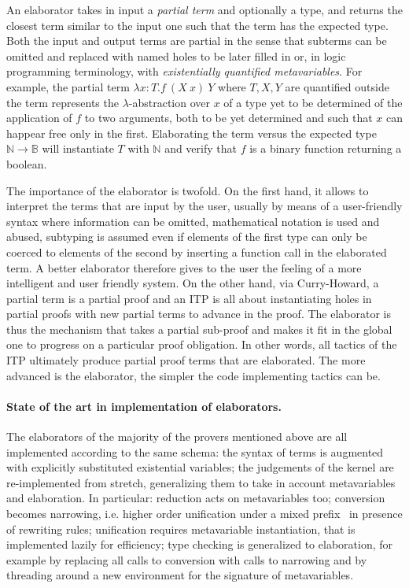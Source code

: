 \documentclass{easychair}
\begin{document}
An elaborator takes in input a \emph{partial term} and optionally a
type, and returns the closest term similar to the input one such that
the term has the expected type. Both the input and output terms are
partial in the sense that subterms can be omitted and replaced with
named holes to be later filled in or, in logic programming
terminology, with \emph{existentially quantified metavariables}. For
example, the partial term $\lambda x: T. f~(X~x)~Y$ where $T,X,Y$ are
quantified outside the term represents the $\lambda$-abstraction over
$x$ of a type yet to be determined of the application of $f$ to two
arguments, both to be yet determined and such that $x$ can happear
free only in the first. Elaborating the term versus the expected type
$\mathbb{N} \to \mathbb{B}$ will instantiate $T$ with $\mathbb{N}$ and
verify that $f$ is a binary function returning a boolean.

The importance of the elaborator is twofold. On the first hand, it
allows to interpret the terms that are input by the user, usually by
means of a user-friendly syntax where information can be omitted,
mathematical notation is used and abused, subtyping is assumed even if
elements of the first type can only be coerced to elements of the
second by inserting a function call in the elaborated term. A better
elaborator therefore gives to the user the feeling of a more
intelligent and user friendly system. On the other hand, via
Curry-Howard, a partial term is a partial proof and an ITP is all
about instantiating holes in partial proofs with new partial terms to
advance in the proof. The elaborator is thus the mechanism that takes
a partial sub-proof and makes it fit in the global one to progress on
a particular proof obligation. In other words, all tactics of the ITP
ultimately produce partial proof terms that are elaborated. The more
advanced is the elaborator, the simpler the code implementing tactics
can be.

\paragraph{State of the art in implementation of elaborators.}

The elaborators of the majority of the provers mentioned above are all
implemented according to the same schema: the syntax of terms is
augmented with explicitly substituted existential variables; the
judgements of the kernel are re-implemented from stretch, generalizing
them to take in account metavariables and elaboration. In particular:
reduction acts on metavariables too; conversion becomes narrowing,
i.e. higher order unification under a mixed prefix~\cite{???} in
presence of rewriting rules; unification requires metavariable
instantiation, that is implemented lazily for efficiency; type
checking is generalized to elaboration, for example by replacing all
calls to conversion with calls to narrowing and by threading around a
new environment for the signature of metavariables.
\end{document}

